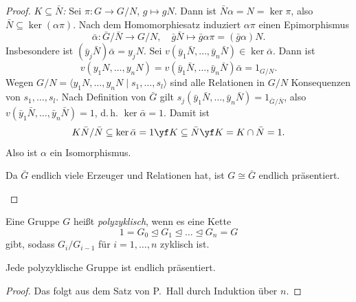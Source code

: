 \documentclass[11pt]{article}
\begin{document}
\begin{proof}
  \textit{$K \subseteq \bar{N}$:} Sei $\pi\colon G \to G/N$, $g \mapsto gN$. Dann ist $\bar{N}\alpha = N = \ker\pi$, also $\bar{N} \subseteq \ker(\alpha\pi)$. Nach dem Homomorphiesatz induziert $\alpha\pi$ einen Epimorphismus
  \[ \bar{\alpha}\colon \bar{G}/\bar{N} \to G/N, \quad \bar{g}\bar{N} \mapsto \bar{g}\alpha\pi = (\bar{g}\alpha)N. \]
  Insbesondere ist $(\bar{y}_j \bar{N})\bar{\alpha} = y_j N$. Sei $v(\bar{y}_1\bar{N}, \dots, \bar{y}_n\bar{N}) \in \ker\bar{\alpha}$. Dann ist
  \[ v(y_1 N, \dots, y_n N) = v(\bar{y}_1\bar{N}, \dots, \bar{y}_n\bar{N})\bar{\alpha} = 1_{G/N}. \]
  Wegen $G/N = \langle y_1 N, \dots, y_n N \mid s_1, \dots, s_l \rangle$ sind alle Relationen in $G/N$ Konsequenzen von $s_1, \dots, s_l$. Nach Definition von $\bar{G}$ gilt $s_j(\bar{y}_1\bar{N}, \dots, \bar{y}_n\bar{N}) = 1_{\bar{G}/\bar{N}}$, also $v(\bar{y}_1\bar{N}, \dots, \bar{y}_n\bar{N}) = 1$, d.\,h. $\ker\bar{\alpha} = 1$. Damit ist
  \[ K\bar{N}/\bar{N} \subseteq \ker\bar{\alpha} = 1 \yf K \subseteq \bar{N} \yf K = K \cap \bar{N} = 1. \]
  Also ist $\alpha$ ein Isomorphismus.
\begin{ergaenzung}
  Da $\bar{G}$ endlich viele Erzeuger und Relationen hat, ist $G \cong \bar{G}$ endlich präsentiert.
  \end{ergaenzung}
\end{proof}


\begin{definition}\Theorem
  Eine Gruppe $G$ heißt \emph{polyzyklisch}, wenn es eine Kette
  \[ 1 = G_0 \trianglelefteq G_1 \trianglelefteq \dots \trianglelefteq G_n = G \]
  gibt, sodass $G_i / G_{i-1}$ für $i = 1, \dots, n$ zyklisch ist.
\end{definition}


\begin{corollary}\Theorem
  Jede polyzyklische Gruppe ist endlich präsentiert.
\end{corollary}

\begin{proof}
  Das folgt aus dem Satz von P.~Hall durch Induktion über $n$.
\end{proof}




\PropertyNotice
\end{document}
